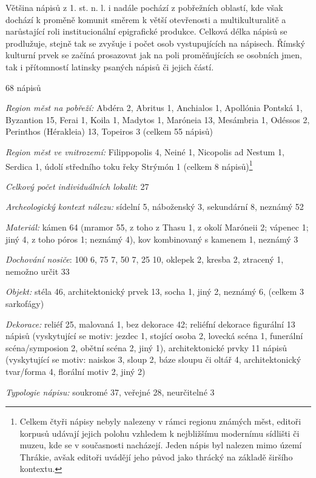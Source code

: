 Většina nápisů z 1. st. n. l. i nadále pochází z pobřežních oblastí, kde však dochází k proměně komunit směrem k větší otevřenosti a multikulturalitě a narůstající roli institucionální epigrafické produkce. Celková délka nápisů se prodlužuje, stejně tak se zvyšuje i počet osob vystupujících na nápisech. Římský kulturní prvek se začíná prosazovat jak na poli proměňujících se osobních jmen, tak i přítomností latinsky psaných nápisů či jejich částí.

\placetable[none]{}
\starttable[|l|]
\HL
{} 68 nápisů

{\em Region měst na pobřeží:} Abdéra 2, Abritus 1, Anchialos 1, Apollónia Pontská 1, Byzantion 15, Ferai 1, Koila 1, Madytos 1, Maróneia 13, Mesámbria 1, Odéssos 2, Perinthos (Hérakleia) 13, Topeiros 3 (celkem 55 nápisů)

{\em Region měst ve vnitrozemí:} Filippopolis 4, Neiné 1, Nicopolis ad Nestum 1, Serdica 1, údolí středního toku řeky Strýmón 1 (celkem 8 nápisů)\footnote{Celkem čtyři nápisy nebyly nalezeny v rámci regionu známých měst, editoři korpusů udávají jejich polohu vzhledem k nejbližšímu modernímu sídlišti či muzeu, kde se v současnosti nacházejí. Jeden nápis byl nalezen mimo území Thrákie, avšak editoři uvádějí jeho původ jako thrácký na základě širšího kontextu.}

{\em Celkový počet individuálních lokalit}: 27

{\em Archeologický kontext nálezu:} sídelní 5, náboženský 3, sekundární 8, neznámý 52

{\em Materiál:} kámen 64 (mramor 55, z toho z Thasu 1, z okolí Maróneii 2; vápenec 1; jiný 4, z toho póros 1; neznámý 4), kov kombinovaný s kamenem 1, neznámý 3

{\em Dochování nosiče}: 100  6, 75  7, 50  7, 25  10, oklepek 2, kresba 2, ztracený 1, nemožno určit 33

{\em Objekt:} stéla 46, architektonický prvek 13, socha 1, jiný 2, neznámý 6, (celkem 3 sarkofágy)

{\em Dekorace:} reliéf 25, malovaná 1, bez dekorace 42; reliéfní dekorace figurální 13 nápisů (vyskytující se motiv: jezdec 1, stojící osoba 2, lovecká scéna 1, funerální scéna/symposion 2, obětní scéna 2, jiný 1), architektonické prvky 11 nápisů (vyskytující se motiv: naiskos 3, sloup 2, báze sloupu či oltář 4, architektonický tvar/forma 4, florální motiv 2, jiný 2)

{\em Typologie nápisu:} soukromé 37, veřejné 28, neurčitelné 3

